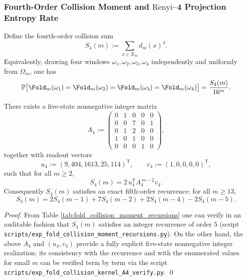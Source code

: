 \subsubsection{Fourth-Order Collision Moment and \texorpdfstring{$\mathrm{R\acute{e}nyi}$}{Renyi}--4 Projection Entropy Rate}\label{subsec:pom-s4}
\begin{definition}\label{def:pom-s4}
Define the fourth-order collision sum
$$
S_4(m):=\sum_{x\in X_m} d_m(x)^4.
$$
Equivalently, drawing four windows \(\omega_1,\omega_2,\omega_3,\omega_4\) independently and uniformly from \(\Omega_m\), one has
$$
\mathbb{P}\bigl[\Fold_m(\omega_1)=\Fold_m(\omega_2)=\Fold_m(\omega_3)=\Fold_m(\omega_4)\bigr]=\frac{S_4(m)}{16^m}.
$$
\end{definition}

\begin{proposition}\label{prop:pom-s4-recurrence}
There exists a five-state nonnegative integer matrix
$$
A_4:=
\begin{pmatrix}
0&1&0&0&0\\
0&0&7&0&1\\
0&1&2&0&0\\
1&0&1&0&0\\
0&0&0&1&0
\end{pmatrix},
$$
together with readout vectors
$$
u_4:=(9,404,1613,25,114)^{\mathsf T},\qquad
v_4:=(1,0,0,0,0)^{\mathsf T},
$$
such that for all \(m\ge 2\),
$$
S_4(m)=2\,u_4^{\mathsf T}A_4^{\,m-2}v_4.
$$
Consequently \(S_4(m)\) satisfies an exact fifth-order recurrence: for all \(m\ge 13\),
$$
S_4(m)=2S_4(m-1)+7S_4(m-2)+2S_4(m-4)-2S_4(m-5).
$$
\end{proposition}
\begin{proof}
From Table \ref{tab:fold_collision_moment_recursions} one can verify in an auditable fashion that \(S_4(m)\) satisfies an integer recurrence of order \(5\) (script \texttt{scripts/exp\_fold\_collision\_moment\_recursions.py}). On the other hand, the above \(A_4\) and \((u_4,v_4)\) provide a fully explicit five-state nonnegative integer realization; its consistency with the recurrence and with the enumerated values for small \(m\) can be verified term by term via the script \texttt{scripts/exp\_fold\_collision\_kernel\_A4\_verify.py}. \qed
\end{proof}

